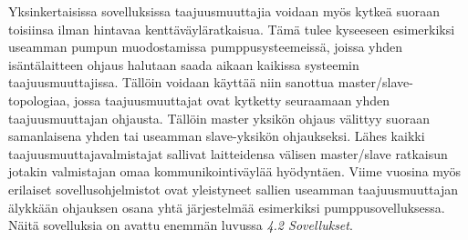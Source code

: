 \documentclass[finnish,12pt,a4paper,pdftex,elec,utf8]{aaltothesis}
\begin{document}
Yksinkertaisissa sovelluksissa taajuusmuuttajia voidaan myös kytkeä suoraan toisiinsa ilman hintavaa kenttäväyläratkaisua. Tämä tulee kyseeseen esimerkiksi useamman pumpun muodostamissa pumppusysteemeissä, joissa yhden isäntälaitteen ohjaus halutaan saada aikaan kaikissa systeemin taajuusmuuttajissa. Tällöin voidaan käyttää niin sanottua master/slave-topologiaa, jossa taajuusmuuttajat ovat kytketty seuraamaan yhden taajuusmuuttajan ohjausta. Tällöin master yksikön ohjaus välittyy suoraan samanlaisena yhden tai useamman slave-yksikön ohjaukseksi. Lähes kaikki taajuusmuuttajavalmistajat sallivat laitteidensa välisen master/slave ratkaisun jotakin valmistajan omaa kommunikointiväylää hyödyntäen. Viime vuosina myös erilaiset sovellusohjelmistot ovat yleistyneet sallien useamman taajuusmuuttajan älykkään ohjauksen osana yhtä järjestelmää esimerkiksi pumppusovelluksessa. Näitä sovelluksia on avattu enemmän luvussa  \textit{4.2 Sovellukset}.


\end{document}
